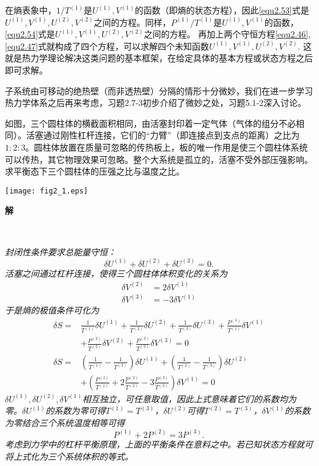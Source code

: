 在熵表象中，$1 / T^{(1)}$是$U^{(1)}, V^{(1)}$的函数（即熵的状态方程），因此\eqref{equ2.53}式是$U^{(1)}, V^{(1)}, U^{(2)}, V^{(2)}$之间的方程。同样，$P^{(1)} / T^{(1)}$是$U^{(1)}, V^{(1)}$的函数，\eqref{equ2.54}式是$U^{(1)}, V^{(1)}, U^{(2)}, V^{(2)}$之间的方程。 再加上两个守恒方程\eqref{equ2.46}, \eqref{equ2.47}式就构成了四个方程，可以求解四个未知函数$U^{(1)}, V^{(1)}, U^{(2)}, V^{(2)}$. 这就是热力学理论解决这类问题的基本框架，在给定具体的基本方程或状态方程之后即可求解。

子系统由可移动的绝热壁（而非透热壁）分隔的情形十分微妙，我们在进一步学习热力学体系之后再来考虑，习题2.7-3初步介绍了微妙之处，习题5.1-2深入讨论。

\begin{example}


如图，三个圆柱体的横截面积相同，由活塞封印着一定气体（气体的组分不必相同）。活塞通过刚性杠杆连接，它们的“力臂”（即连接点到支点的距离）之比为$1 : 2 : 3$。圆柱体放置在质量可忽略的传热板上，板的唯一作用是使三个圆柱体系统可以传热，其它物理效果可忽略。整个大系统是孤立的，活塞不受外部压强影响。求平衡态下三个圆柱体的压强之比与温度之比。

{
	\centering
	\texttt{[image: fig2\_1.eps]} 
}


{\bf 解}

\ 

{\it 
	封闭性条件要求总能量守恒：
	\[
		\delta U^{(1)} + \delta U^{(2)} + \delta U^{(3)} = 0.
	\]
	活塞之间通过杠杆连接，使得三个圆柱体体积变化的关系为
	\begin{align*}
		\delta V^{(2)} &= 2 \delta V^{(1)} \\
		\delta V^{(3)} &= -3 \delta V^{(1)}
	\end{align*}
	于是熵的极值条件可化为
	\begin{align*}
		\delta S =& \frac{1}{T^{(1)}} \delta U^{(1)} + \frac{1}{T^{(2)}} \delta U^{(2)} + \frac{1}{T^{(3)}} \delta U^{(3)} + \frac{P^{(1)}}{T^{(1)}} \delta V^{(1)} \\
		&+ \frac{P^{(2)}}{T^{(2)}} \delta V^{(2)} + \frac{P^{(3)}}{T^{(3)}} \delta V^{(3)} = 0 \\
		\delta S =& \left( \frac{1}{T^{(1)}} - \frac{1}{T^{(3)}} \right) \delta U^{(1)} + \left( \frac{1}{T^{(2)}} - \frac{1}{T^{(3)}} \right) \delta U^{(2)} \\
		&+ \left( \frac{P^{(1)}}{T^{(1)}} + 2\frac{P^{(2)}}{T^{(2)}} - 3\frac{P^{(3)}}{T^{(3)}} \right) \delta V^{(1)} = 0
	\end{align*}
	$\delta U^{(1)}, \delta U^{(2)}, \delta V^{(1)}$相互独立，可任意取值，因此上式意味着它们的系数均为零。$\delta U^{(1)}$的系数为零可得$T^{(1)} = T^{(3)}$，$\delta U^{(2)}$可得$T^{(2)} = T^{(3)}$，$\delta V^{(1)}$的系数为零结合三个系统温度相等可得
	\[ P^{(1)} + 2P^{(2)} = 3P^{(3)}. \]
	考虑到力学中的杠杆平衡原理，上面的平衡条件在意料之中。若已知状态方程就可将上式化为三个系统体积的等式。
}
\end{example}


